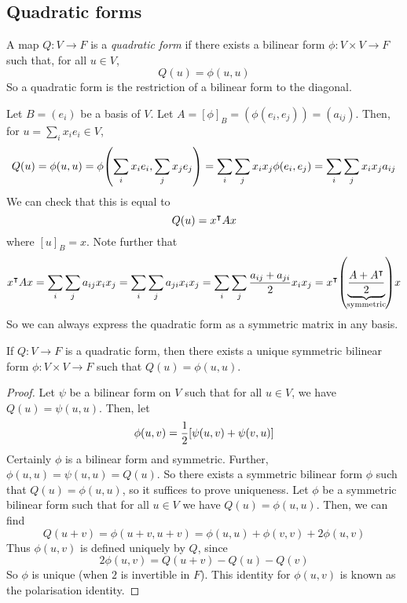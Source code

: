 \subsection{Quadratic forms}
\begin{definition}
	A map \( Q \colon V \to F \) is a \textit{quadratic form} if there exists a bilinear form \( \phi \colon V \times V \to F \) such that, for all \( u \in V \),
	\[
		Q(u) = \phi(u,u)
	\]
	So a quadratic form is the restriction of a bilinear form to the diagonal.
\end{definition}
\begin{remark}
	Let \( B = (e_i) \) be a basis of \( V \).
	Let \( A = [\phi]_B = (\phi(e_i, e_j)) = (a_{ij}) \).
	Then, for \( u = \sum_i x_i e_i \in V \),
	\[
		Q(u) = \phi(u,u) = \phi\qty(\sum_i x_i e_i, \sum_j x_j e_j) = \sum_i \sum_j x_i x_j \phi(e_i, e_j) = \sum_i \sum_j x_i x_j a_{ij}
	\]
	We can check that this is equal to
	\[
		Q(u) = x^\intercal A x
	\]
	where \( [u]_B = x \).
	Note further that
	\[
		x^\transpose A x = \sum_i \sum_j a_{ij} x_i x_j = \sum_i \sum_j a_{ji} x_i x_j = \sum_i \sum_j \frac{a_{ij} + a_{ji}}{2} x_i x_j = x^\transpose \qty(\underbrace{\frac{A + A^\transpose}{2}}_{\mathclap{\text{symmetric}}}) x
	\]
	So we can always express the quadratic form as a symmetric matrix in any basis.
\end{remark}
\begin{proposition}
	If \( Q \colon V \to F \) is a quadratic form, then there exists a unique symmetric bilinear form \( \phi \colon V \times V \to F \) such that \( Q(u) = \phi(u,u) \).
\end{proposition}
\begin{proof}
	Let \( \psi \) be a bilinear form on \( V \) such that for all \( u \in V \), we have \( Q(u) = \psi(u,u) \).
	Then, let
	\[
		\phi(u,v) = \frac{1}{2}\qty[\psi(u,v) + \psi(v,u)]
	\]
	Certainly \( \phi \) is a bilinear form and symmetric.
	Further, \( \phi(u,u) = \psi(u,u) = Q(u) \).
	So there exists a symmetric bilinear form \( \phi \) such that \( Q(u) = \phi(u,u) \), so it suffices to prove uniqueness.
	Let \( \phi \) be a symmetric bilinear form such that for all \( u \in V \) we have \( Q(u) = \phi(u,u) \).
	Then, we can find
	\[
		Q(u + v) = \phi(u + v, u + v) = \phi(u,u) + \phi(v,v) + 2\phi(u,v)
	\]
	Thus \( \phi(u,v) \) is defined uniquely by \( Q \), since
	\[
		2 \phi(u,v) = Q(u+v) - Q(u) - Q(v)
	\]
	So \( \phi \) is unique (when \( 2 \) is invertible in \( F \)).
	This identity for \( \phi(u,v) \) is known as the polarisation identity.
\end{proof}

